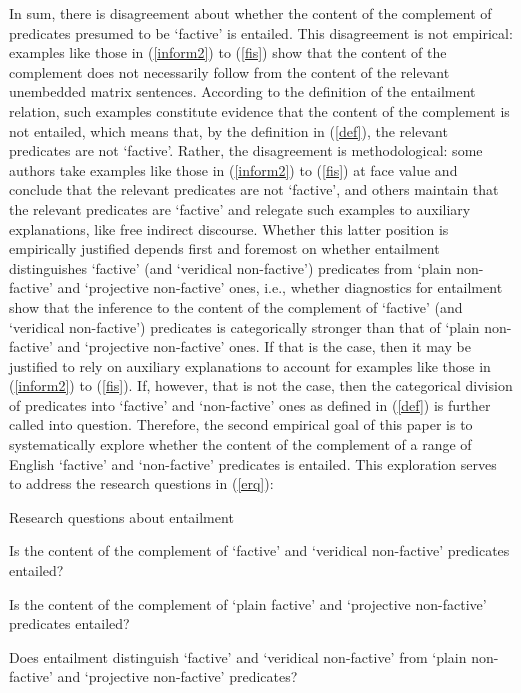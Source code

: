 \documentclass[11pt,fleqn]{article}
\newcommand{\6}{\mbox{$[\hspace*{-.6mm}[$}}
\newcommand{\9}{\mbox{$]\hspace*{-.6mm}]$}}
\begin{document}
In sum, there is disagreement about whether the content of the complement of predicates presumed to be `factive' is entailed. This disagreement is not empirical: examples like those in (\ref{inform2}) to (\ref{fis}) show that the content of the complement does not necessarily follow from the content of the relevant unembedded matrix sentences. According to the definition of the entailment relation, such examples constitute evidence that the content of the complement is not entailed, which means that, by the definition in (\ref{def}), the relevant predicates are not `factive'. Rather, the disagreement is methodological: some authors take examples like those in (\ref{inform2}) to (\ref{fis}) at face value and conclude that the relevant predicates are not `factive', and others maintain that the relevant predicates are `factive' and relegate such examples to auxiliary explanations, like free indirect discourse. Whether this latter position is empirically justified depends first and foremost on whether entailment distinguishes `factive' (and `veridical non-factive') predicates from `plain non-factive' and `projective non-factive' ones, i.e., whether diagnostics for entailment show that the inference to the content of the complement of `factive' (and `veridical non-factive') predicates is categorically stronger than that of `plain non-factive' and `projective non-factive' ones. If that is the case, then it may be justified to rely on auxiliary explanations to account for examples like those in (\ref{inform2}) to (\ref{fis}). If, however, that is not the case, then the categorical division of predicates into `factive' and `non-factive' ones as defined in (\ref{def}) is further called into question. Therefore, the second empirical goal of this paper is to systematically explore whether the content of the complement of a range of English `factive' and `non-factive' predicates is entailed. This exploration serves to address the research questions in (\ref{erq}):

\begin{exe}
\ex\label{erq} Research questions about entailment
\begin{xlist}
\ex Is the content of the complement of `factive' and `veridical non-factive' predicates entailed?

\ex Is the content of the complement of `plain factive' and `projective non-factive' predicates entailed?

\ex Does entailment distinguish `factive' and `veridical non-factive' from `plain non-factive' and `projective non-factive' predicates?
\end{xlist}
\end{exe}
\end{document}
